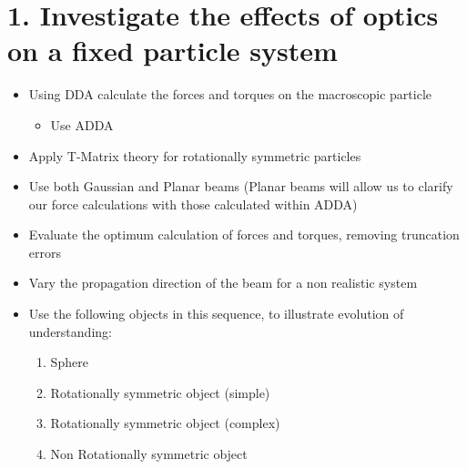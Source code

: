 \documentclass[11pt]{meetingmins}
\begin{document}
\maketitle

\section{1. Investigate the effects of optics on a fixed particle system}

\begin{itemize}

\item Using DDA calculate the forces and torques on the macroscopic particle

\begin{itemize}

\item Use ADDA

\end{itemize}

\item Apply T-Matrix theory for rotationally symmetric particles

\item Use both Gaussian and Planar beams (Planar beams will allow us to clarify our force calculations with those calculated within ADDA)

\item Evaluate the optimum calculation of forces and torques, removing truncation errors

\item Vary the propagation direction of the beam for a non realistic system

\item Use the following objects in this sequence, to illustrate evolution of understanding:

\begin{enumerate}

\item Sphere

\item Rotationally symmetric object (simple)

\item Rotationally symmetric object (complex)

\item Non Rotationally symmetric object

\end{enumerate}

\end{itemize}
\end{document}
